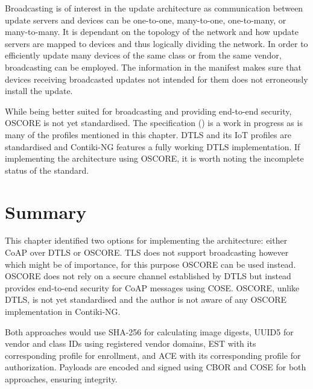 \documentclass[0-thesis.tex]{subfiles}
\begin{document}
Broadcasting is of interest in the update architecture as communication between update
servers and devices can be one-to-one, many-to-one, one-to-many, or many-to-many. It is
dependant on the topology of the network and how update servers are mapped to devices and
thus logically dividing the network. In order to efficiently update many devices of the
same class or from the same vendor, broadcasting can be employed. The information in the
manifest makes sure that devices receiving broadcasted updates not intended for them does
not erroneously install the update.

While being better suited for broadcasting and providing end-to-end security, OSCORE is
not yet standardised. The specification (\parencite{oscore}) is a work in progress as is
many of the profiles mentioned in this chapter. DTLS and its IoT profiles are standardised
and Contiki-NG features a fully working DTLS implementation. If implementing the
architecture using OSCORE, it is worth noting the incomplete status of the standard.

\section{Summary}
\label{sec:profile-summary}
This chapter identified two options for implementing the architecture: either CoAP over
DTLS or OSCORE. TLS does not support broadcasting however which might be of importance,
for this purpose OSCORE can be used instead. OSCORE does not rely on a secure channel
established by DTLS but instead provides end-to-end security for CoAP messages using COSE.
OSCORE, unlike DTLS, is not yet standardised and the author is not aware of any OSCORE
implementation in Contiki-NG. 

Both approaches would use SHA-256 for calculating image digests, UUID5 for vendor and
class IDs using registered vendor domains, EST with its corresponding profile for
enrollment, and ACE with its corresponding profile for authorization. Payloads are encoded
and signed using CBOR and COSE for both approaches, ensuring integrity.
\end{document}
